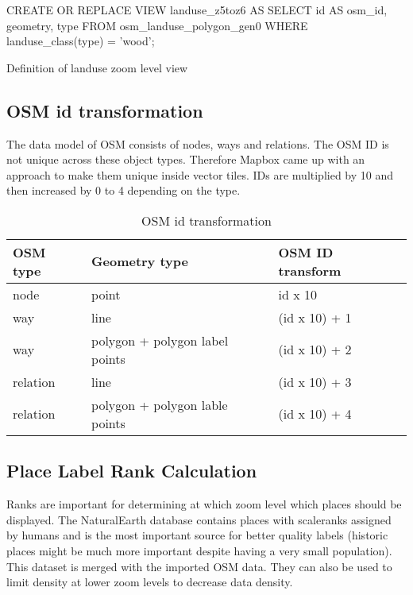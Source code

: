 \begin{listing}[H]
\begin{sqlcode}
CREATE OR REPLACE VIEW landuse_z5toz6 AS
    SELECT id AS osm_id, geometry, type
    FROM osm_landuse_polygon_gen0
    WHERE landuse_class(type) = 'wood';
\end{sqlcode}
\caption{Definition of landuse zoom level view}
\label{definition_of_landuse_zoom_level_view}
\end{listing}


\subsection{OSM id transformation}

The data model of OSM consists of nodes, ways and relations. The OSM ID is not unique across these object types. Therefore Mapbox came up with an approach to make them unique inside vector tiles. IDs are multiplied by 10 and then increased by 0 to 4 depending on the type\cite{103_mapbox.com_2016}.

\begin{table}[H]
\centering

\begin{tabular}{|l|l|l|}
\hline
OSM type & Geometry type                  & OSM ID transform \\ \hline
node     & point                          & id x 10          \\ \hline
way      & line                           & (id x 10) + 1    \\ \hline
way      & polygon + polygon label points & (id x 10) + 2    \\ \hline
relation & line                           & (id x 10) + 3    \\ \hline
relation & polygon + polygon lable points & (id x 10) + 4    \\ \hline
\end{tabular}
\caption{OSM id transformation}
\label{my-label}
\end{table}



\newpage{}
\subsection{Place Label Rank Calculation}

Ranks are important for determining at which zoom level which places should be displayed. The NaturalEarth database contains places with scaleranks assigned by humans and is the most important source for better quality labels (historic places might be much more important despite having a very small population). This dataset is merged with the imported OSM data.
They can also be used to limit density at lower zoom levels to decrease data density.

